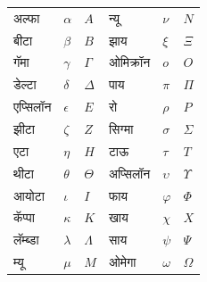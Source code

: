 \documentclass[../../../include/open-logic-chapter]{subfiles}
\begin{document}

\begin{center}
    \begin{tabular}{lll@{\qquad}lll}
    अल्फा &	$\alpha$ & $A$ &
    न्यू & $\nu$ & $N$ \\
    बीटा & $\beta$ & $B$ &
    झाय & $\xi$ & $\Xi$ \\
    गॅमा &	$\gamma$ & $\Gamma$ &
    ओमिक्रॉन & $o$ & $O$ \\
    डेल्टा & $\delta$ & $\Delta$ &
    पाय & $\pi$ & $\Pi$ \\
    एप्सिलॉन & $\epsilon$ & $E$ &
    रो & $\rho$ & $P$ \\
    झीटा & $\zeta$ & $Z$ &
    सिग्मा &	$\sigma$ & $\Sigma$ \\
    एटा & $\eta$ & $H$ &
    टाऊ & $\tau$ & $T$ \\
    थीटा & $\theta$ & $\Theta$ &
    अप्सिलॉन & $\upsilon$ & $\Upsilon$ \\
    आयोटा & $\iota$ & $I$ &
    फाय & $\varphi$ & $\Phi$ \\
    कॅप्पा & $\kappa$ & $K$ &
    खाय & $\chi$ & $X$ \\
    लॅम्ब्डा & $\lambda$ & $\Lambda$ &
    साय & $\psi$ & $\Psi$ \\
    म्यू & $\mu$ & $M$ &
    ओमेगा & $\omega$ & $\Omega$
    \end{tabular}
\end{center}
\end{document}
